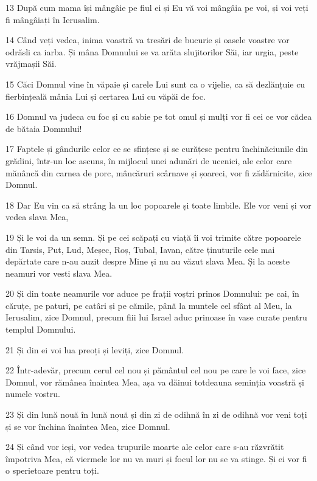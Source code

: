 \par 13 După cum mama își mângâie pe fiul ei și Eu vă voi mângâia pe voi, și voi veți fi mângâiați în Ierusalim.
\par 14 Când veți vedea, inima voastră va tresări de bucurie și oasele voastre vor odrăsli ca iarba. Și mâna Domnului se va arăta slujitorilor Săi, iar urgia, peste vrăjmașii Săi.
\par 15 Căci Domnul vine în văpaie și carele Lui sunt ca o vijelie, ca să dezlănțuie cu fierbințeală mânia Lui și certarea Lui cu văpăi de foc.
\par 16 Domnul va judeca cu foc și cu sabie pe tot omul și mulți vor fi cei ce vor cădea de bătaia Domnului!
\par 17 Faptele și gândurile celor ce se sfințesc și se curățesc pentru închinăciunile din grădini, într-un loc ascuns, în mijlocul unei adunări de ucenici, ale celor care mănâncă din carnea de porc, mâncăruri scârnave și șoareci, vor fi zădărnicite, zice Domnul.
\par 18 Dar Eu vin ca să strâng la un loc popoarele și toate limbile. Ele vor veni și vor vedea slava Mea,
\par 19 Și le voi da un semn. Și pe cei scăpați cu viață îi voi trimite către popoarele din Tarsis, Put, Lud, Meșec, Roș, Tubal, Iavan, către ținuturile cele mai depărtate care n-au auzit despre Mine și nu au văzut slava Mea. Și la aceste neamuri vor vesti slava Mea.
\par 20 Și din toate neamurile vor aduce pe frații voștri prinos Domnului: pe cai, în căruțe, pe paturi, pe catâri și pe cămile, până la muntele cel sfânt al Meu, la Ierusalim, zice Domnul, precum fiii lui Israel aduc prinoase în vase curate pentru templul Domnului.
\par 21 Și din ei voi lua preoți și leviți, zice Domnul.
\par 22 Într-adevăr, precum cerul cel nou și pământul cel nou pe care le voi face, zice Domnul, vor rămânea înaintea Mea, așa va dăinui totdeauna seminția voastră și numele vostru.
\par 23 Și din lună nouă în lună nouă și din zi de odihnă în zi de odihnă vor veni toți și se vor închina înaintea Mea, zice Domnul.
\par 24 Și când vor ieși, vor vedea trupurile moarte ale celor care s-au răzvrătit împotriva Mea, că viermele lor nu va muri și focul lor nu se va stinge. Și ei vor fi o sperietoare pentru toți.




